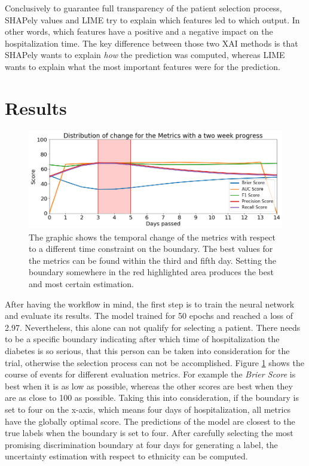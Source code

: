 \documentclass[journal]{IEEEtran}
\begin{document}
Conclusively to guarantee full transparency of the patient selection process, SHAPely values and LIME try to explain which features led to which output. In other words, which features have a positive and a negative impact on the hospitalization time. The key difference between those two XAI methods is that SHAPely wants to explain \textit{how} the prediction was computed, whereas LIME wants to explain what the most important features were for the prediction.


%
%
\section{Results} 
\begin{figure}
	\centering
	\includegraphics[width=1\linewidth]{../imgs/metrics_time}
	\caption{The graphic shows the temporal change of the metrics with respect to a different time constraint on the boundary. The best values for the metrics can be found within the third and fifth day. Setting the boundary somewhere in the red highlighted area produces the best and most certain estimation.}
	\label{fig:change}
\end{figure}
\noindent After having the workflow in mind, the first step is to train the neural network and evaluate its results. The model trained for 50 epochs and reached a loss of 2.97.  Nevertheless, this alone can not qualify for selecting a patient. There needs to be a specific boundary indicating after which time of hospitalization the diabetes is so serious, that this person can be taken into consideration for the trial, otherwise the selection process can not be accomplished.
Figure \ref{fig:change} shows the course of events for different evaluation metrics. For example the \textit{Brier Score} is best when it is as low as possible, whereas the other scores are best when they are as close to 100 as possible. Taking this into consideration,  if the boundary is set to four on the x-axis, which means four days of hospitalization, all metrics have the globally optimal score. The predictions of the model are closest to the true labels when the boundary is set to four. 
After carefully selecting the most promising discrimination boundary at four days for generating a label, the uncertainty estimation with respect to ethnicity can be computed. \\ \\ \\
\end{document}
